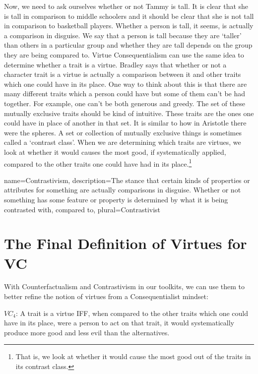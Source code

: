Now, we need to ask ourselves whether or not Tammy is tall. It is clear that she is tall in comparison to middle schoolers and it should be clear that she is not tall in comparison to basketball players. Whether a person is tall, it seems, is actually a comparison in disguise. We say that a person is tall because they are `taller' than others in a particular group and whether they are tall depends on the group they are being compared to. Virtue Consequentialism can use the same idea to determine whether a trait is a virtue. Bradley says that whether or not a character trait is a virtue is actually a comparison between it and other traits which one could have in its place. One way to think about this is that there are many different traits which a person could have but some of them can’t be had together. For example, one can’t be both generous and greedy. The set of these mutually exclusive traits should be kind of intuitive. These traits are the ones one could have in place of another in that set. It is similar to how in Aristotle there were the spheres. A set or collection of mutually exclusive things is sometimes called a `contrast class'. When we are determining which traits are virtues, we look at whether it would causes the most good, if systematically applied, compared to the other traits one could have had in its place.\footnote{That is, we look at whether it would cause the most good out of the traits in its contrast class.}  

{
  name=Contrastivism,
  description={The stance that certain kinds of properties or attributes for something are actually comparisons in disguise. Whether or not something has some feature or property is determined by what it is being contrasted with, compared to},
  plural=Contrastivist
}


\section{The Final Definition of Virtues for VC}

With Counterfactualism and Contrastivism in our toolkits, we can use them to better refine the notion of virtues from a Consequentialist mindset:

\begin{center}
$VC_4$: A trait is a virtue IFF, when compared to the other traits which one could have in its place, were a person to act on that trait, it would systematically produce more good and less evil than the alternatives. 
\end{center}

